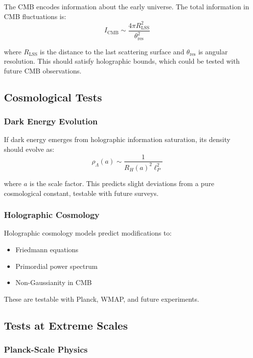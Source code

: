 \documentclass[11pt,a4paper]{article}
\theoremstyle{plain}
\theoremstyle{definition}
\theoremstyle{remark}
\begin{document}
The CMB encodes information about the early universe. The total information in CMB fluctuations is:
\begin{equation}
I_{\text{CMB}} \sim \frac{4\pi R_{\text{LSS}}^2}{\theta_{\text{res}}^2}
\end{equation}

where $R_{\text{LSS}}$ is the distance to the last scattering surface and $\theta_{\text{res}}$ is angular resolution. This should satisfy holographic bounds, which could be tested with future CMB observations.

\subsection{Cosmological Tests}

\subsubsection{Dark Energy Evolution}

If dark energy emerges from holographic information saturation, its density should evolve as:
\begin{equation}
\rho_{\Lambda}(a) \sim \frac{1}{R_H(a)^2\ell_P^2}
\end{equation}

where $a$ is the scale factor. This predicts slight deviations from a pure cosmological constant, testable with future surveys.

\subsubsection{Holographic Cosmology}

Holographic cosmology models predict modifications to:
\begin{itemize}[leftmargin=*]
\item Friedmann equations
\item Primordial power spectrum
\item Non-Gaussianity in CMB
\end{itemize}

These are testable with Planck, WMAP, and future experiments.

\subsection{Tests at Extreme Scales}

\subsubsection{Planck-Scale Physics}
\end{document}
